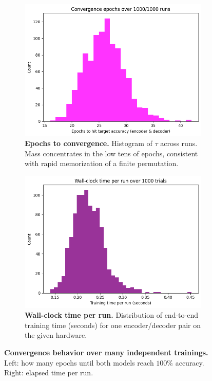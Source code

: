 \documentclass[12pt]{article}
\theoremstyle{plain}
\theoremstyle{remark}
\begin{document}
\begin{figure}[t]
    \centering
    \begin{subfigure}{0.49\textwidth}
        \centering
        \includegraphics[width=\linewidth]{convergence_epochs.png}
        \caption{\textbf{Epochs to convergence.} Histogram of $\tau$ across runs. Mass concentrates in the low tens of epochs, consistent with rapid memorization of a finite permutation.}
        \label{fig:epochs-conv}
    \end{subfigure}
    \hfill
    \begin{subfigure}{0.49\textwidth}
        \centering
        \includegraphics[width=\linewidth]{time-distribution.png}
        \caption{\textbf{Wall-clock time per run.} Distribution of end-to-end training time (seconds) for one encoder/decoder pair on the given hardware.}
        \label{fig:time-dist}
    \end{subfigure}
    \caption{\textbf{Convergence behavior over many independent trainings.} Left: how many epochs until both models reach $100\%$ accuracy. Right: elapsed time per run.}
    \label{fig:convergence-summary}
\end{figure}
\end{document}

